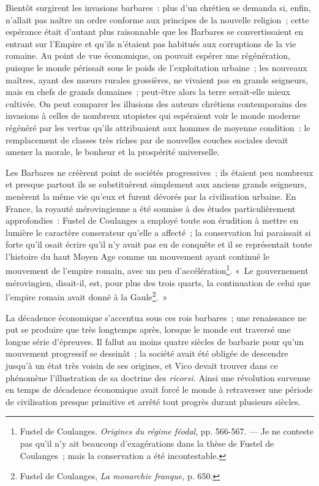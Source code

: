 \documentclass[french,twoside]{book} %
\begin{document}
Bientôt surgirent les invasions barbares : plus d’un chrétien se demanda si, enfin, n’allait pas naître un ordre conforme aux principes de la nouvelle religion ; cette espérance était d’autant plus raisonnable que les Barbares se convertissaient en entrant sur l’Empire et qu’ils n’étaient pas habitués aux corruptions de la vie romaine. Au point de vue économique, on pouvait espérer une régénération, puisque le monde périssait sous le poids de l’exploitation urbaine ; les nouveaux maîtres, ayant des mœurs rurales grossières, ne vivaient pas en grands seigneurs, mais en chefs de grands domaines ; peut-être alors la terre serait-elle mieux cultivée. On peut comparer les illusions des auteurs chrétiens contemporains des invasions à celles de nombreux utopistes qui espéraient voir le monde moderne régénéré par les vertus qu’ils attribuaient aux hommes de moyenne condition : le remplacement de classes très riches par de nouvelles couches sociales devait amener la morale, le bonheur et la prospérité universelle.\par
Les Barbares ne créèrent point de sociétés progressives ; ils étaient peu nombreux et presque partout ils se substituèrent simplement aux anciens grands seigneurs, menèrent la même vie qu’eux et furent dévorés par la civilisation urbaine. En France, la royauté mérovingienne a été soumise à des études particulièrement approfondies : Fustel de Coulanges a employé toute son érudition à mettre en lumière le caractère conserateur qu’elle  a affecté ; la conservation lui paraissait si forte qu’il osait écrire qu’il n’y avait pas eu de conquête et il se représentait toute l’histoire du haut Moyen Age comme un mouvement ayant continué le mouvement de l’empire romain, avec un peu d’accélération\footnote{ \noindent Fustel de Coulanges. \emph{Origines du régime féodal}, pp. 566-567. — Je ne conteste pas qu’il n’y ait beaucoup d’exagérations dans la thèse de Fustel de Coulanges ; mais la conservation a été incontestable.
 }. « Le gouvernement mérovingien, disait-il, est, pour plus des trois quarts, la continuation de celui que l’empire romain avait donné à la Gaule\footnote{ \noindent Fustel de Coulanges, \emph{La monarchie franque,} p. 650.
 }. »\par
La décadence économique s’accentua sous ces rois barbares ; une renaissance ne put se produire que très longtemps après, lorsque le monde eut traversé une longue série d’épreuves. Il fallut au moins quatre siècles de barbarie pour qu’un mouvement progressif se dessinât ; la société avait été obligée de descendre jusqu’à un état très voisin de ses origines, et Vico devait trouver dans ce phénomène l’illustration de sa doctrine des \emph{ricorsi.} Ainsi une révolution survenue en temps de décadence économique avait forcé le monde à retraverser une période de civilisation presque primitive et arrêté tout progrès durant plusieurs siècles.\par
\end{document}
